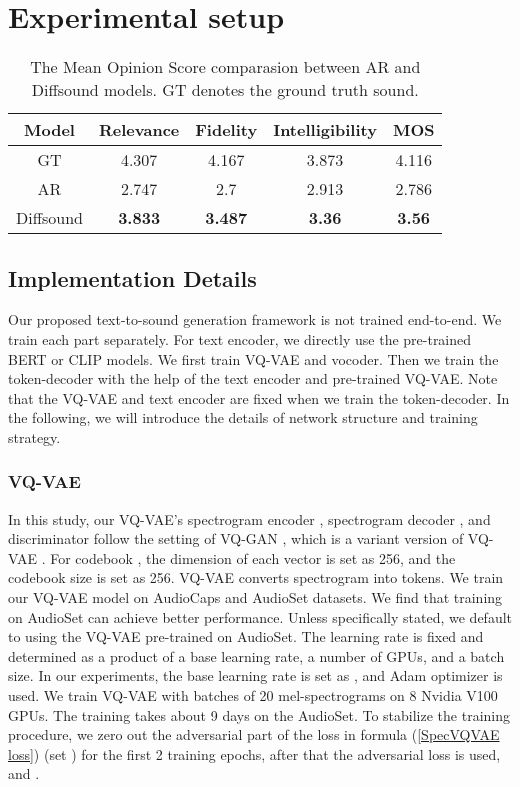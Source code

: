 \documentclass[lettersize,journal]{IEEEtran}
\begin{document}
\section{Experimental setup} \label{experimental setup}
\begin{table}[t] \centering
\caption{The Mean Opinion Score comparasion between AR and Diffsound models. GT denotes the ground truth sound.}
\label{tab:my-table1}
\begin{tabular}{ccccc}
\hline
Model     & Relevance & Fidelity & Intelligibility & MOS   \\ \hline
GT        & 4.307     & 4.167    & 3.873           & 4.116 \\ \hline
AR        & 2.747     & 2.7      & 2.913           & 2.786 \\
Diffsound & \textbf{3.833}     & \textbf{3.487}    & \textbf{3.36}            & \textbf{3.56}  \\ \hline
\end{tabular}
\end{table}
\subsection{Implementation Details}
{\color{black}Our proposed text-to-sound generation framework is not trained end-to-end.} We train each part separately. For text encoder, we directly use the pre-trained BERT or CLIP models. We first train VQ-VAE and vocoder. Then we train the token-decoder with the help of the text encoder and pre-trained VQ-VAE. Note that the VQ-VAE and text encoder are fixed when we train the token-decoder. In the following, we will introduce the details of network structure and training strategy.
\subsubsection{VQ-VAE} In this study, our VQ-VAE's spectrogram encoder , spectrogram decoder , and discriminator  follow the setting of VQ-GAN \cite{esser2021taming,iashin2021taming}, which is a variant version of VQ-VAE \cite{van2017neural}. For codebook , the dimension of each vector  is set as 256, and the codebook size  is set as 256. VQ-VAE converts  spectrogram into  tokens. We train our VQ-VAE model on AudioCaps and AudioSet datasets. We find that training on AudioSet can achieve better performance. Unless specifically stated, we default to using the VQ-VAE pre-trained on AudioSet. The learning rate is fixed and determined as a product of a base learning rate, a number of GPUs, and a batch size. In our experiments, the base learning rate is set as , and Adam optimizer \cite{kingma2014adam} is used. We train VQ-VAE with batches of 20 mel-spectrograms on 8 Nvidia V100 GPUs. The training takes about 9 days on the AudioSet. To stabilize the training procedure, we zero out the adversarial part of the loss in formula (\ref{SpecVQVAE loss}) (set ) for the first 2 training epochs, after that the adversarial loss is used, and . 
\end{document}
